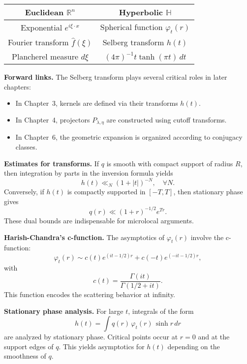 \begin{center}
\begin{tabular}{|c|c|}
\hline
Euclidean $\mathbb{R}^{n}$ & Hyperbolic $\mathbb{H}$ \\
\hline
Exponential $e^{i\xi\cdot x}$ & Spherical function $\varphi_{t}(r)$ \\
Fourier transform $\hat f(\xi)$ & Selberg transform $h(t)$ \\
Plancherel measure $d\xi$ & $(4\pi)^{-1} t\tanh(\pi t)\,dt$ \\
\hline
\end{tabular}
\end{center}

\medskip

\noindent\textbf{Forward links.}
The Selberg transform plays several critical roles in later chapters:
\begin{itemize}
  \item In Chapter~3, kernels are defined via their transforms $h(t)$.
  \item In Chapter~4, projectors $P_{\lambda,\eta}$ are constructed using cutoff transforms.
  \item In Chapter~6, the geometric expansion is organized according to conjugacy classes.
\end{itemize}

\medskip

\noindent\textbf{Estimates for transforms.}
If $q$ is smooth with compact support of radius $R$,
then integration by parts in the inversion formula yields
\[
  h(t) \ll_{N} (1+|t|)^{-N}, \quad \forall N.
\]
Conversely, if $h(t)$ is compactly supported in $[-T,T]$,
then stationary phase gives
\[
  q(r) \ll (1+r)^{-1/2} e^{Tr}.
\]
These dual bounds are indispensable for microlocal arguments.

\medskip

\noindent\textbf{Harish-Chandra’s c-function.}
The asymptotics of $\varphi_{t}(r)$ involve the c-function:
\[
  \varphi_{t}(r) \sim c(t) e^{(it-1/2)r} + c(-t)e^{(-it-1/2)r},
\]
with
\[
  c(t) = \frac{\Gamma(it)}{\Gamma(1/2+it)}.
\]
This function encodes the scattering behavior at infinity.

\medskip

\noindent\textbf{Stationary phase analysis.}
For large $t$, integrals of the form
\[
  h(t) = \int q(r)\,\varphi_{t}(r)\,\sinh r\,dr
\]
are analyzed by stationary phase.
Critical points occur at $r=0$ and at the support edges of $q$.
This yields asymptotics for $h(t)$ depending on the smoothness of $q$.

